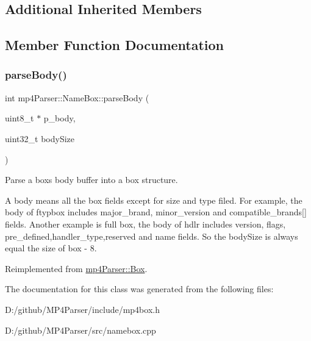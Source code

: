 \subsection*{Additional Inherited Members}


\subsection{Member Function Documentation}
\mbox{\label{classmp4_parser_1_1_name_box_ae7f3b3a458b89f874f2f6584fd7e0123}} 
\subsubsection{\texorpdfstring{parseBody()}{parseBody()}}
{\footnotesize\ttfamily int mp4\+Parser\+::\+Name\+Box\+::parse\+Body (\begin{DoxyParamCaption}\item[{uint8\+\_\+t $\ast$}]{p\+\_\+body,  }\item[{uint32\+\_\+t}]{body\+Size }\end{DoxyParamCaption})\hspace{0.3cm}{\ttfamily [virtual]}}



Parse a box\textquotesingle{}s body buffer into a box structure. 

A body means all the box fields except for size and type filed. For example, the body of ftypbox includes major\+\_\+brand, minor\+\_\+version and compatible\+\_\+brands\mbox{[}\mbox{]} fields. Another example is full box, the body of hdlr includes version, flags, pre\+\_\+defined,handler\+\_\+type,reserved and name fields. So the body\+Size is always equal the size of box -\/ 8. 

Reimplemented from \mbox{\hyperlink{classmp4_parser_1_1_box_a3dd0c084ac65bc77b69ac5ecaf796cb2}{mp4\+Parser\+::\+Box}}.



The documentation for this class was generated from the following files\+:\begin{DoxyCompactItemize}
\item 
D\+:/github/\+M\+P4\+Parser/include/mp4box.\+h\item 
D\+:/github/\+M\+P4\+Parser/src/namebox.\+cpp\end{DoxyCompactItemize}
